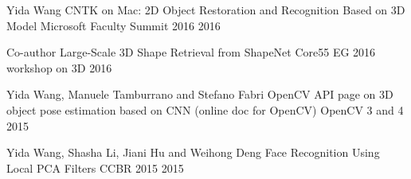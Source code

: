 \begin{cventries}

\cventry
{Yida Wang} %
{CNTK on Mac: 2D Object Restoration and Recognition Based on 3D Model} %
{Microsoft Faculty Summit 2016} %
{2016} %
{ %
}

\cventry
{Co-­author} %
{Large-Scale 3D Shape Retrieval from ShapeNet Core55} %
{EG 2016 workshop on 3D} %
{2016} %
{ %
}


\cventry
{Yida Wang, Manuele Tamburrano and Stefano Fabri} %
{OpenCV API page on 3D object pose estimation based on CNN (online doc for OpenCV)} %
{OpenCV 3 and 4} %
{2015} %
{ %
}

\cventry
{Yida Wang, Shasha Li, Jiani Hu and Weihong Deng} %
{Face Recognition Using Local PCA Filters} %
{CCBR 2015} %
{2015} %
{ %
}


\end{cventries}
